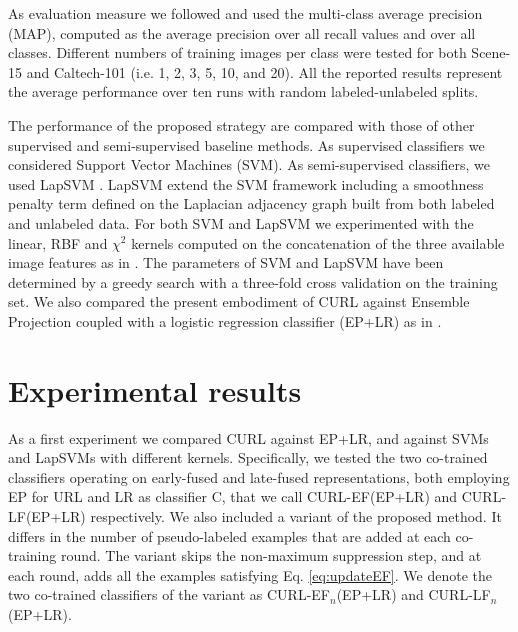 \documentclass[journal,11pt]{IEEEtran}
\newcommand{\ADD}[1]{#1}
\newcommand{\coso}{strategy}
\newcommand{\emb}{embodiment}
\newcommand{\curlef}{CURL-EF(EP+LR)}
\newcommand{\curllf}{CURL-LF(EP+LR)}
\newcommand{\curlefn}{CURL-EF$_n$(EP+LR)}
\newcommand{\curllfn}{CURL-LF$_n$(EP+LR)}
\begin{document}
As evaluation measure we followed \cite{dai2013ensemble} and used the multi-class average precision (MAP),
computed as the average precision over all recall values and over all
classes.  Different numbers of training images per class were tested
for both Scene-15 and Caltech-101 (i.e. 1, 2, 3, 5, 10, and 20).  All the
reported results represent the average performance over ten runs with
random labeled-unlabeled splits.

The performance of the proposed \coso{ } are compared with those of
other supervised and semi-supervised \ADD{baseline} methods. As supervised
classifiers we considered Support Vector Machines (SVM).  As
semi-supervised classifiers, we used LapSVM
\cite{sindhwani2005beyond,belkin2006manifold}. LapSVM extend the SVM
framework including a smoothness penalty term defined on the
Laplacian adjacency graph built from both labeled and unlabeled data.
For both SVM and LapSVM we experimented with the linear, RBF and
$\chi^2$ kernels computed on the concatenation of the three available
image features as in \cite{dai2013ensemble}.  The parameters of SVM and LapSVM have been determined by
a greedy search with a three-fold cross validation on the training
set. We also compared \ADD{the present \emb{ } of CURL against} Ensemble Projection coupled with a logistic regression classifier (EP+LR) as in \cite{dai2013ensemble}. %

\section{Experimental results}\label{sec:results}
As a first experiment we compared CURL against EP+LR, and against
SVMs and LapSVMs with different kernels. Specifically, we tested the two co-trained classifiers operating on early-fused and late-fused representations, both employing EP for URL and LR as classifier C, that we call \curlef{ } and \curllf{ } respectively. 
We also included a variant of the proposed method. It differs in the number of pseudo-labeled examples that are added at each co-training round. The variant skips the non-maximum suppression step, and at each round, adds all the examples satisfying Eq. \ref{eq:updateEF}. We denote the two co-trained classifiers of the variant as \curlefn{ } and \curllfn.
\end{document}
